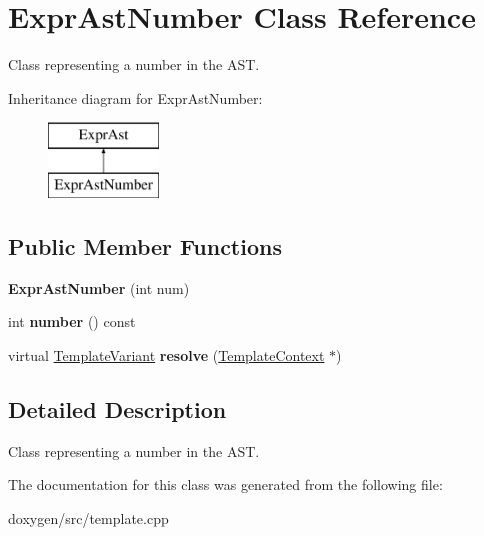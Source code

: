 \hypertarget{class_expr_ast_number}{}\section{Expr\+Ast\+Number Class Reference}
\label{class_expr_ast_number}


Class representing a number in the A\+ST.  


Inheritance diagram for Expr\+Ast\+Number\+:\begin{figure}[H]
\begin{center}
\leavevmode
\includegraphics[height=2.000000cm]{class_expr_ast_number}
\end{center}
\end{figure}
\subsection*{Public Member Functions}
\begin{DoxyCompactItemize}
\item 
\mbox{\label{class_expr_ast_number_add5556c7435b685fc97e30072317f52b}} 
{\bfseries Expr\+Ast\+Number} (int num)
\item 
\mbox{\label{class_expr_ast_number_a1cf927a38140e59c1950c5fe6a44b96f}} 
int {\bfseries number} () const
\item 
\mbox{\label{class_expr_ast_number_a82e85367f4be61dfb87142e138502ddb}} 
virtual \mbox{\hyperlink{class_template_variant}{Template\+Variant}} {\bfseries resolve} (\mbox{\hyperlink{class_template_context}{Template\+Context}} $\ast$)
\end{DoxyCompactItemize}


\subsection{Detailed Description}
Class representing a number in the A\+ST. 

The documentation for this class was generated from the following file\+:\begin{DoxyCompactItemize}
\item 
doxygen/src/template.\+cpp\end{DoxyCompactItemize}
